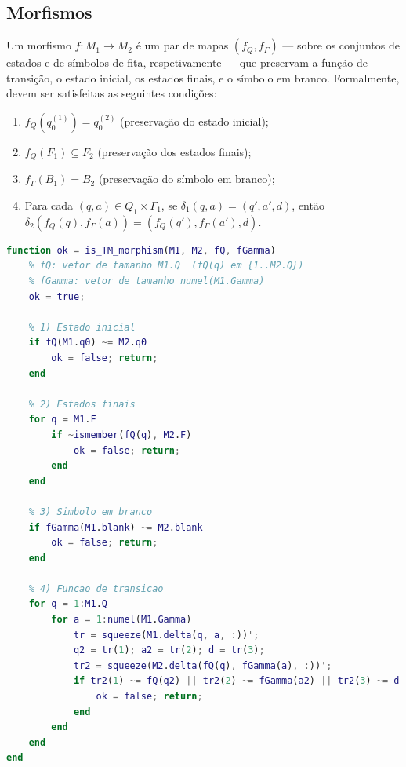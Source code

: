 \subsection{Morfismos}
Um morfismo $f: M_1 \to M_2$ é um par de mapas $(f_Q, f_\Gamma)$ --- sobre os conjuntos de estados e de símbolos de fita, respetivamente --- que preservam a função de transição, o estado inicial, os estados finais, e o símbolo em branco. Formalmente, devem ser satisfeitas as seguintes condições:
\begin{enumerate}
    \item $f_Q(q_0^{(1)}) = q_0^{(2)}$ (preservação do estado inicial);
    \item $f_Q(F_1) \subseteq F_2$ (preservação dos estados finais);
    \item $f_\Gamma(B_1) = B_2$ (preservação do símbolo em branco);
    \item Para cada $(q, a) \in Q_1 \times \Gamma_1$, se $\delta_1(q, a) = (q', a', d)$, então $\delta_2(f_Q(q), f_\Gamma(a)) = (f_Q(q'), f_\Gamma(a'), d)$.
\end{enumerate}

\begin{lstlisting}[language=Matlab, caption={Verificação de um morfismo de Máquinas de Turing}]
function ok = is_TM_morphism(M1, M2, fQ, fGamma)
    % fQ: vetor de tamanho M1.Q  (fQ(q) em {1..M2.Q})
    % fGamma: vetor de tamanho numel(M1.Gamma)
    ok = true;
    
    % 1) Estado inicial
    if fQ(M1.q0) ~= M2.q0
        ok = false; return;
    end
    
    % 2) Estados finais
    for q = M1.F
        if ~ismember(fQ(q), M2.F)
            ok = false; return;
        end
    end
    
    % 3) Simbolo em branco
    if fGamma(M1.blank) ~= M2.blank
        ok = false; return;
    end
    
    % 4) Funcao de transicao
    for q = 1:M1.Q
        for a = 1:numel(M1.Gamma)
            tr = squeeze(M1.delta(q, a, :))';
            q2 = tr(1); a2 = tr(2); d = tr(3);
            tr2 = squeeze(M2.delta(fQ(q), fGamma(a), :))';
            if tr2(1) ~= fQ(q2) || tr2(2) ~= fGamma(a2) || tr2(3) ~= d
                ok = false; return;
            end
        end
    end
end
\end{lstlisting}